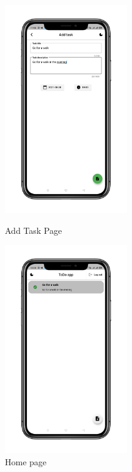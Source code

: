 \begin{figure}
\centering
\begin{minipage}{.5\textwidth}
  \centering
   \includegraphics[height=90mm]{Images & Logos/theme/CH_08_Light_3.png}
  \caption{Add Task Page}
\end{minipage}%
\begin{minipage}{.5\textwidth}
  \centering
   \includegraphics[height=90mm]{Images & Logos/theme/CH_08_Light_4.png}
  \caption{Home page}
\end{minipage}
\newpage
\end{figure}

